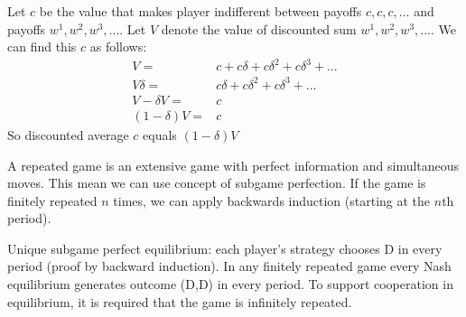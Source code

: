 \begin{example}
    Let $c$ be the value that makes player indifferent between payoffs $c, c, c, ... $ and payoffs
    $w^1 , w^2 , w^3 , ...$.
    Let $V$ denote the value of discounted sum $w^1 , w^2 , w^3 , ...$. We can find this $c$ as follows:
    \begin{align*}
        V =           & c + c\delta + c\delta^2 + c\delta^3 + ... \\
        V\delta =     & c\delta + c\delta^2 + c\delta^3 + ...     \\
        V-\delta V =  & c \tag{subtract \delta V from both sides} \\
        (1-\delta)V = & c
    \end{align*}
    So discounted average $c$ equals $(1 - \delta)V$
\end{example}

\begin{remark}
    A repeated game is an extensive game with perfect information and
    simultaneous moves. This mean we can use concept of subgame perfection. If the game is finitely repeated $n$ times, we can apply backwards induction (starting at the $n$th period).
\end{remark}

\begin{example}
    Unique subgame perfect equilibrium: each player's strategy chooses D in every period (proof by backward induction). In any finitely repeated game every Nash equilibrium generates outcome (D,D) in every period. To support cooperation in equilibrium, it is required that the game is infinitely repeated.
\end{example}


